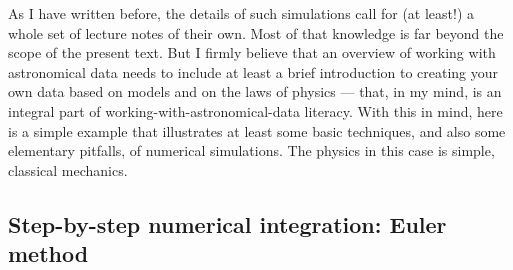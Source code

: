 \documentclass[twocolumn,apj]{openjournal}
\begin{document}
As I have written before, the details of such simulations call for (at least!) a whole set of lecture notes of their own. Most of that knowledge is far beyond the scope of the present text. But I firmly believe that an overview of working with astronomical data needs to include at least a brief introduction to creating your own data based on models and on the laws of physics --- that, in my mind, is an integral part of working-with-astronomical-data literacy. With this in mind, here is a simple example that illustrates at least some basic techniques, and also some elementary pitfalls, of numerical simulations. The physics in this case is simple, classical mechanics.

\subsection{Step-by-step numerical integration: Euler method}
\end{document}
